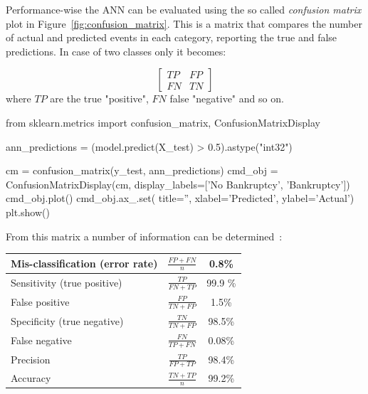 Performance-wise the ANN can be evaluated using the so called \emph{confusion matrix} plot in Figure~\ref{fig:confusion_matrix}. This is a matrix that compares the number of actual and predicted events in each category, reporting the true and false predictions. In case of two classes only it becomes:

\begin{equation*}
\begin{bmatrix}
TP & FP \\
FN & TN  
\end{bmatrix}
\end{equation*}
\noindent
where $TP$ are the true "positive", $FN$ false "negative" and so on.

\begin{ipython}
from sklearn.metrics import confusion_matrix, ConfusionMatrixDisplay

ann_predictions = (model.predict(X_test) > 0.5).astype("int32")

cm = confusion_matrix(y_test, ann_predictions)
cmd_obj = ConfusionMatrixDisplay(cm, display_labels=['No Bankruptcy', 'Bankruptcy'])
cmd_obj.plot()
cmd_obj.ax_.set(
                title='',
                xlabel='Predicted',
                ylabel='Actual')
plt.show()
\end{ipython}

From this matrix a number of information can be determined~\cite{bib:sensitivity}:

\makegapedcells\begin{table}[htbp]
\centering
\begin{tabular}{|l|c|c|}
\hline
Mis-classification (error rate) & $\frac{FP+FN}{n}$ & 0.8\% \\
\hline
Sensitivity (true positive) & $\frac{TP}{FN+TP}$ & 99.9 \% \\
\hline
False positive & $\frac{FP}{TN+FP}$ & 1.5\% \\
\hline
Specificity (true negative) & $\frac{TN}{TN+FP}$ &  98.5\% \\
\hline
False negative & $\frac{FN}{TP+FN}$ & 0.08\% \\
\hline
Precision & $\frac{TP}{FP+TP}$ & 98.4\% \\ 
\hline
Accuracy & $\frac{TN+TP}{n}$ & 99.2\% \\
\hline
\end{tabular}
\end{table}

